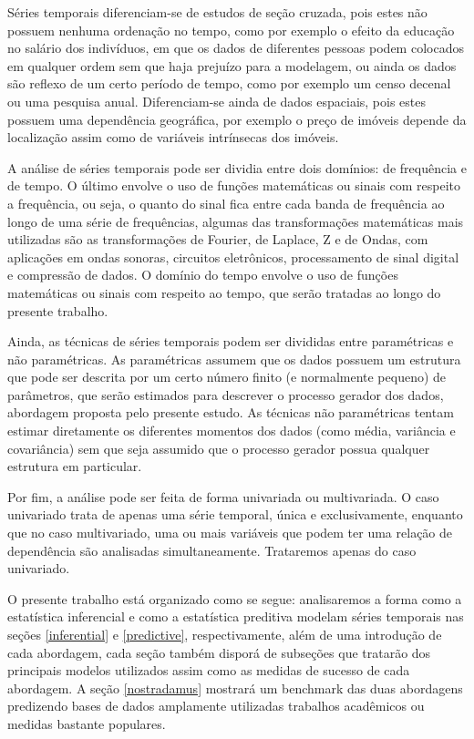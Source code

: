 \documentclass[twocolumn]{rbef}
\newcommand{\1}{\mathbbm{1}}
\begin{document}
Séries temporais diferenciam-se de estudos de seção cruzada, pois estes não possuem nenhuma ordenação no tempo, como por exemplo o efeito da educação no salário dos indivíduos, em que os dados de diferentes pessoas podem colocados em qualquer ordem sem que haja prejuízo para a modelagem, ou ainda os dados são reflexo de um certo período de tempo, como por exemplo um censo decenal ou uma pesquisa anual. Diferenciam-se ainda de dados espaciais, pois estes possuem uma dependência geográfica, por exemplo o preço de imóveis depende da localização assim como de variáveis intrínsecas dos imóveis.

A análise de séries temporais pode ser dividia entre dois domínios: de frequência e de tempo. O último envolve o uso de funções matemáticas  ou sinais com respeito a frequência, ou seja, o quanto do sinal fica entre cada banda de frequência ao longo de uma série de frequências, algumas das transformações matemáticas mais utilizadas são as transformações de Fourier, de Laplace, Z e de Ondas, com aplicações em ondas sonoras, circuitos eletrônicos, processamento de sinal digital e compressão de dados. O domínio do tempo envolve o uso de funções matemáticas ou sinais com respeito ao tempo, que serão tratadas ao longo do presente trabalho.

Ainda, as técnicas de séries temporais podem ser divididas entre paramétricas e não paramétricas. As paramétricas assumem que os dados possuem um estrutura que pode ser descrita por um certo número finito (e normalmente pequeno) de parâmetros, que serão estimados para descrever o processo gerador dos dados, abordagem proposta pelo presente estudo. As técnicas não paramétricas tentam estimar diretamente os diferentes momentos dos dados (como média, variância e covariância) sem que seja assumido que o processo gerador possua qualquer estrutura em particular.

Por fim, a análise pode ser feita de forma univariada ou multivariada. O caso univariado trata de apenas uma série temporal, única e exclusivamente, enquanto que no caso multivariado, uma ou mais variáveis que podem ter uma relação de dependência são analisadas simultaneamente. Trataremos apenas do caso univariado.


O presente trabalho está organizado como se segue: analisaremos a forma como a estatística inferencial e como a estatística preditiva modelam séries temporais nas seções \ref{inferential} e \ref{predictive}, respectivamente, além de uma introdução de cada abordagem, cada seção também disporá de subseções que tratarão dos principais modelos utilizados assim como as medidas de sucesso de cada abordagem. A seção \ref{nostradamus} mostrará um benchmark das duas abordagens predizendo bases de dados amplamente utilizadas trabalhos acadêmicos ou medidas bastante populares.
\end{document}
